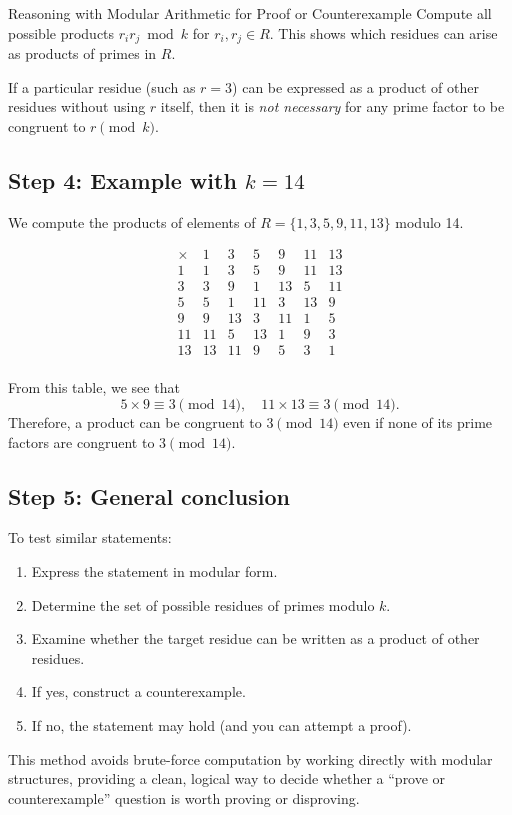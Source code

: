 \documentclass{tufte-handout}
\begin{document}
\begin{section}{Reasoning with Modular Arithmetic for Proof or Counterexample}
Compute all possible products \(r_i r_j \bmod{k}\) for \(r_i, r_j \in R\).
This shows which residues can arise as products of primes in \(R\).

If a particular residue (such as \(r = 3\)) can be expressed as a product of 
other residues without using \(r\) itself, then it is \emph{not necessary}
for any prime factor to be congruent to \(r \pmod{k}\).


\subsection*{Step 4: Example with \(k = 14\)}

We compute the products of elements of \(R = \{1, 3, 5, 9, 11, 13\}\) modulo 14.

\[
\begin{array}{c|cccccc}
\times & 1 & 3 & 5 & 9 & 11 & 13 \\\hline
1 & 1 & 3 & 5 & 9 & 11 & 13 \\
3 & 3 & 9 & 1 & 13 & 5 & 11 \\
5 & 5 & 1 & 11 & 3 & 13 & 9 \\
9 & 9 & 13 & 3 & 11 & 1 & 5 \\
11& 11& 5 & 13 & 1 & 9 & 3 \\
13& 13& 11& 9 & 5 & 3 & 1 \\
\end{array}
\]

From this table, we see that
\[
5 \times 9 \equiv 3 \pmod{14}, \quad 11 \times 13 \equiv 3 \pmod{14}.
\]
Therefore, a product can be congruent to \(3 \pmod{14}\) even if 
none of its prime factors are congruent to \(3 \pmod{14}\).


\subsection*{Step 5: General conclusion}

To test similar statements:

\begin{enumerate}
  \item Express the statement in modular form.
  \item Determine the set of possible residues of primes modulo \(k\).
  \item Examine whether the target residue can be written as a product of other residues.
  \item If yes, construct a counterexample.
  \item If no, the statement may hold (and you can attempt a proof).
\end{enumerate}

This method avoids brute-force computation by working directly with 
modular structures, providing a clean, logical way to decide 
whether a “prove or counterexample” question is worth proving or disproving.

\end{section}
\end{document}
